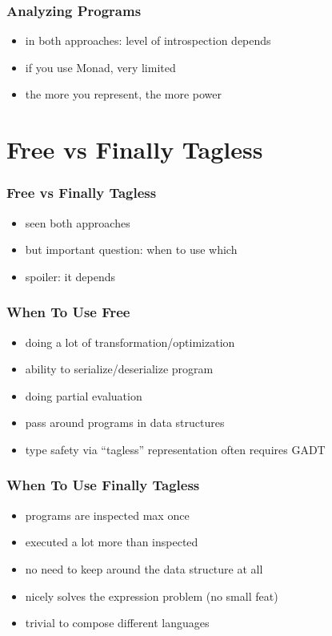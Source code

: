 \documentclass[aspectratio=169]{beamer}
\begin{document}
\begin{frame}
  \frametitle{Analyzing Programs}
  \begin{itemize}
  \item in both approaches: level of introspection depends
  \item if you use Monad, very limited
  \item the more you represent, the more power
  \end{itemize}
\end{frame}

\section{Free vs Finally Tagless}\label{sec:free-vs-tagless}

\begin{frame}
  \frametitle{Free vs Finally Tagless}
  \begin{itemize}
  \item seen both approaches
  \item but important question: when to use which
  \item spoiler: it depends
  \end{itemize}
\end{frame}

\begin{frame}
  \frametitle{When To Use Free}
  \begin{itemize}
  \item doing a lot of transformation/optimization
  \item ability to serialize/deserialize program
  \item doing partial evaluation
  \item pass around programs in data structures
  \item type safety via ``tagless'' representation often requires GADT
  \end{itemize}
\end{frame}

\begin{frame}
  \frametitle{When To Use Finally Tagless}
  \begin{itemize}
  \item programs are inspected max once
  \item executed a lot more than inspected
  \item no need to keep around the data structure at all
  \item nicely solves the expression problem (no small feat)
  \item trivial to compose different languages
  \end{itemize}
\end{frame}
\end{document}
